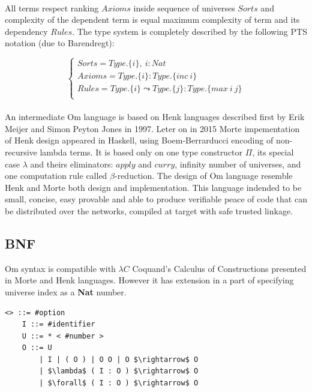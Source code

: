 \documentclass[11pt,oneside]{article}
\begin{document}
   \paragraph{}
   All terms respect ranking $Axioms$ inside sequence of universes $Sorts$ and complexity of the
   dependent term is equal maximum complexity of term and its dependency $Rules$. The type
   system is completely described by the following PTS notation (due to Barendregt):

$$
\begin{cases}
    Sorts = Type.\{i\},\ i : Nat\\
    Axioms = Type.\{i\} : Type.\{inc\ i\}\\
    Rules = Type.\{i\} \leadsto Type.\{j\} : Type.\{max\ i\ j\}\\
\end{cases}
$$

   \paragraph{}
   An intermediate Om language is based on Henk\cite{henk} languages described first
   by Erik Meijer and Simon Peyton Jones in 1997. Leter on in 2015 Morte impementation
   of Henk design appeared in Haskell, using Boem-Berrarducci encoding of non-recursive lambda terms.
   It is based only on one type constructor $\Pi$, its special case $\lambda$ and theirs eliminators:
   $apply$ and $curry$, infinity number of universes,
   and one computation rule called $\beta$-reduction.
   The design of Om language resemble Henk and Morte both
   design and implementation. This language indended to be small, concise, easy provable
   and able to produce verifiable peace of code that can be distributed over the networks,
   compiled at target with safe trusted linkage.

   \subsection{BNF}
\vspace{0.5cm}
   Om syntax is compatible with $\lambda C$ Coquand's Calculus of Constructions presented
   in Morte and Henk languages. However it has extension in a part of specifying
   universe index as a {\bf Nat} number.

\vspace{0.5cm}
\begin{lstlisting}[mathescape=true]
   <> ::= #option
    I ::= #identifier
    U ::= * < #number >
    O ::= U
        | I | ( O ) | O O | O $\rightarrow$ O
        | $\lambda$ ( I : O ) $\rightarrow$ O
        | $\forall$ ( I : O ) $\rightarrow$ O
\end{lstlisting}
\end{document}
